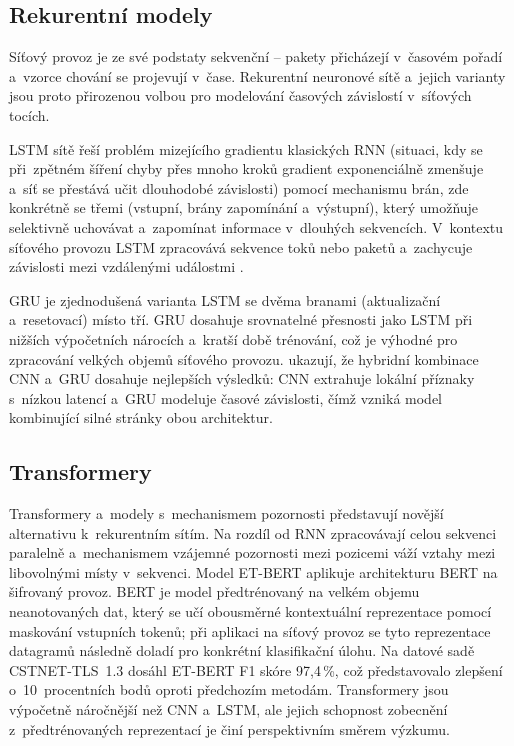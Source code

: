 \subsection{Rekurentní modely}
\label{sec:rekurentni}

Síťový provoz je ze své podstaty sekvenční -- pakety přicházejí v~časovém pořadí a~vzorce chování se projevují v~čase. Rekurentní neuronové sítě a~jejich varianty jsou proto přirozenou volbou pro modelování časových závislostí v~síťových tocích.

LSTM sítě \parencite{Hochreiter1997} řeší problém mizejícího gradientu klasických RNN (situaci, kdy se při~zpětném šíření chyby přes mnoho kroků gradient exponenciálně zmenšuje a~síť se přestává učit dlouhodobé závislosti) pomocí mechanismu brán, zde konkrétně se třemi (vstupní, brány zapomínání a~výstupní), který umožňuje selektivně uchovávat a~zapomínat informace v~dlouhých sekvencích. V~kontextu síťového provozu LSTM zpracovává sekvence toků nebo paketů a~zachycuje závislosti mezi vzdálenými událostmi \parencite{Bakhshi2021}.

GRU \parencite{Cho2014} je zjednodušená varianta LSTM se dvěma branami (aktualizační a~resetovací) místo tří. GRU dosahuje srovnatelné přesnosti jako LSTM při nižších výpočetních nárocích a~kratší době trénování, což je výhodné pro zpracování velkých objemů síťového provozu. \textcite{Bakhshi2021} ukazují, že hybridní kombinace CNN a~GRU dosahuje nejlepších výsledků: CNN extrahuje lokální příznaky s~nízkou latencí a~GRU modeluje časové závislosti, čímž vzniká model kombinující silné stránky obou architektur.

\subsection{Transformery}
\label{sec:transformery}

Transformery a~modely s~mechanismem pozornosti \parencite{Vaswani2017} představují novější alternativu k~rekurentním sítím. Na rozdíl od RNN zpracovávají celou sekvenci paralelně a~mechanismem vzájemné pozornosti mezi pozicemi váží vztahy mezi libovolnými místy v~sekvenci. Model ET-BERT \parencite{Lin2022} aplikuje architekturu BERT \parencite{Devlin2019} na šifrovaný provoz. BERT je model předtrénovaný na velkém objemu neanotovaných dat, který se učí obousměrné kontextuální reprezentace pomocí maskování vstupních tokenů; při aplikaci na síťový provoz se tyto reprezentace datagramů následně doladí pro konkrétní klasifikační úlohu. Na datové sadě CSTNET-TLS~1.3 dosáhl ET-BERT F1 skóre 97,4\,\%, což představovalo zlepšení o~10~procentních bodů oproti předchozím metodám. Transformery jsou výpočetně náročnější než CNN a~LSTM, ale jejich schopnost zobecnění z~předtrénovaných reprezentací je činí perspektivním směrem výzkumu.

